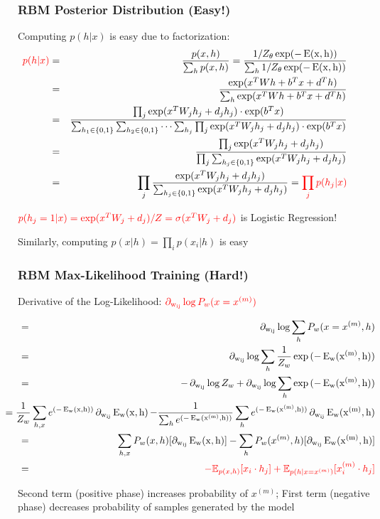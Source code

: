 \begin{frame}[plain]
\frametitle{RBM Posterior Distribution (Easy!)}
\bi
\item Computing $p(h|x)$ is easy due to factorization:
\begin{eqnarray*} 
\hspace{-1cm}{\color{red} p(h|x)} & = &  \frac{p(x,h)}{\sum_h p(x,h)} = \frac{1/Z_\theta \exp(-\Es)}{\sum_h 1/Z_\theta \exp(-\Es)}\\
	 & = & \frac{\exp(x^T W h + b^T x + d^T h)}{\sum_h \exp(x^T W h + b^T x + d^T h)}\\
	& = &  \frac{\prod_j \exp(x^T W_j h_j +  d_j h_j)\cdot \exp(b^Tx)}{\sum_{h_1\in\{0,1\}} \sum_{h_2\in\{0,1\}}\cdots \sum_{h_j} \prod_j\exp(x^T W_j h_j +  d_j h_j)\cdot \exp(b^Tx)}\\
	& = &  \frac{  \prod_j \exp(x^T W_j h_j +  d_j h_j)}{\prod_j \sum_{h_j\in\{0,1\}}   \exp(x^T W_j h_j +  d_j h_j)}\\\
	& = & \prod_j \frac{\exp(x^T W_j h_j +  d_j h_j)}{\sum_{h_j\in\{0,1\}}   \exp(x^T W_j h_j +  d_j h_j)} = {\color{red} \prod_j p(h_j|x)}\\
\end{eqnarray*}
\item ${\color{red} p(h_j=1|x) = \exp(x^T W_j +  d_j)/Z = \sigma(x^T W_j +  d_j)}$ \small{is Logistic Regression!}
\pause
\item Similarly, computing $p(x|h)=\prod_i p(x_i|h)$ is easy
\ei
\end{frame}


\begin{frame}[plain]
\frametitle{RBM Max-Likelihood Training (Hard!)}
Derivative of the Log-Likelihood: ${\color{red} \operatorname*{\partial_{w_{ij}}} \log P_w(x=x^{(m)})}$
\begin{small}
\begin{eqnarray}
&=& \nw \log \sum_{h} P_w(x=x^{(m)},h) \\
&=& \nw \log \sum_h \frac{1}{Z_w} \exp{(-\Em)}\\
&=& -\nw \log Z_w + \nw \log \sum_h \exp{(-\Em)}  \\
& & \hspace{-12mm} =\frac{1}{Z_w} \sum_{h,x} e^{(-\E)} \nw \E - \frac{1}{\sum_h e^{(-\Em)}} \sum_h e^{(-\Em)} \nw \Em  \nonumber \\ 
&=& \sum_{h,x} P_w(x,h) [\nw \E] - \sum_h P_w(x^{(m)},h) [\nw \Em] \\
&=& {\color{red} - \mathbb{E}_{p(x,h)} [ x_i \cdot h_j ] + \mathbb{E}_{p(h|x=x^{(m)})} [ x^{(m)}_i \cdot h_j ]}
\end{eqnarray}
\end{small}
\pause
Second term (positive phase) increases probability of $x^{(m)}$; First term (negative phase) decreases probability of samples generated by the model
\end{frame}

